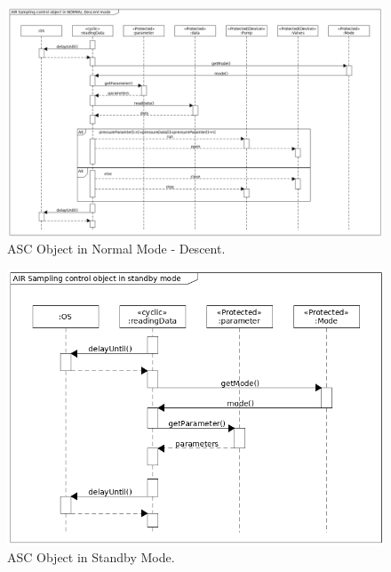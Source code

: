 \documentclass[a4paper,12pt,twoside]{article}
\begin{document}
\begin{appendices}
\begin{landscape}
\begin{figure}[H]
    \centering
    \includegraphics[height=0.9\textwidth]{appendix/img/ASC-seq-dia-v1-2-b.png}
    \caption{ASC Object in Normal Mode - Descent.}
    \label{ASCb}
\end{figure}
\begin{figure}[H]
    \centering
    \includegraphics[height=0.9\textwidth]{appendix/img/ASC-seq-dia-v1-2-c.png}
    \caption{ASC Object in Standby Mode.}
    \label{ASCb}
\end{figure}

\end{landscape}
\end{appendices}
\end{document}
